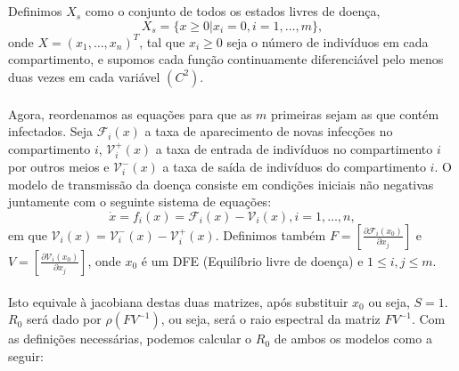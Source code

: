 \\\\
Definimos $X_s$ como o conjunto de todos os estados livres de doença, 
$$X_s=\{x \geq 0|x_i=0, i=1,\ldots,m\},$$
onde $X=(x_1,\ldots, x_n)^T$, tal que $x_i\geq 0$ seja o número de indivíduos em cada compartimento, e supomos cada função continuamente diferenciável pelo menos duas vezes em cada variável $(C^2)$.
\\\\
Agora, reordenamos as equações para que as $m$ primeiras sejam as que contém infectados. Seja ${\mathcal F}_i(x)$ a taxa de aparecimento de novas infecções no compartimento $i$, ${\mathcal V}_i^+(x)$ a taxa de entrada de indivíduos no compartimento $i$ por outros meios e ${\mathcal V}_i^-(x)$ a taxa de saída de indivíduos do compartimento $i$. O modelo de transmissão da doença consiste em condições iniciais não negativas juntamente com o seguinte sistema de equações:
$$\dot{x}=f_i(x)={\mathcal F}_i(x)-{\mathcal V}_i(x), i=1,\ldots, n,$$
em que ${\mathcal V}_i (x) = {\mathcal V}_i^{-}(x) - {\mathcal V}_i^+(x)$. Definimos também $F=\left[\frac{\partial {\mathcal F}_i (x_0)}{\partial x_j}\right]$ e $V=\left[\frac{\partial {\mathcal V}_i (x_0) }{\partial x_j}\right]$, onde $x_0$ é um DFE (Equilíbrio livre de doença) e $1\leq i,j \leq m$. 
\\\\
Isto equivale à jacobiana  destas duas matrizes, após substituir $x_0$ ou seja, $S=1$. $R_0$ será dado por $\rho(FV^{-1})$, ou seja, será o raio espectral da matriz $FV^{-1}$. Com as definições necessárias, podemos calcular o $R_0$ de ambos os modelos como a seguir:

